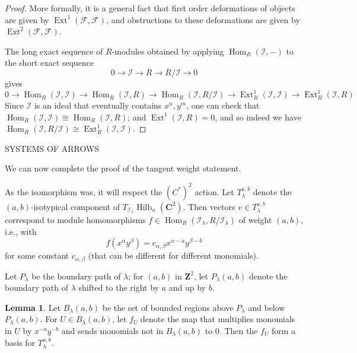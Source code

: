 \documentclass{amsart}[12pt]
\theoremstyle{definition}
\newtheorem{lemma}[dummy]{Lemma}
\newcommand{\Z}{\mathbf{Z}}
\newcommand{\C}{\mathbf{C}}
\newcommand{\II}{\mathcal{I}}
\DeclareMathOperator{\Hilb}{Hilb}
\DeclareMathOperator{\Ext}{Ext}
\DeclareMathOperator{\Hom}{Hom}
\begin{document}
\begin{proof}
More formally, it is a general fact that first order deformations of objects are given by $\Ext^1(\mathcal{F},\mathcal{F})$, and obstructions to these deformations are given by $\Ext^2(\mathcal{F},\mathcal{F})$. 

The long exact sequence of $R$-modules obtained by applying $\Hom_R(\II, -)$ to the short exact sequence
$$0\to \II\to R\to R/\II\to 0$$
gives 
$$0\to\Hom_R(\II,\II)\to \Hom_R(\II, R)\to\Hom_R(\II,R/\II)\to\Ext_R^1(\II, \II)\to\Ext_R^1(\II,R)$$
Since $\II$ is an ideal that eventually contains $x^n, y^m$, one can check that  $\Hom_R(\II,\II)\cong\Hom_R(\II, R)$;  and $\Ext^1(\II,R)=0$, and so indeed we have $\Hom_R(\II,R/\II)\cong\Ext_R^1(\II, \II)$.
\end{proof}


SYSTEMS OF ARROWS

We can now complete the proof of the tangent weight statement.

As the isomorphism was, it will respect the $(C^*)^2$ action.  Let $T_\lambda^{a,b}$ denote the $(a,b)$-isotypical component of $T_{\II_\lambda}\Hilb_n(\C^2)$.  Then vectors $v\in T_\lambda^{a,b}$ correspond to module homomorphisms $f\in\Hom_R(\II_\lambda, R/\II_\lambda)$ of weight $(a,b)$, i.e., with
$$f(x^{\alpha}y^\beta)=c_{\alpha,\beta} x^{\alpha-a}y^{\beta-b}$$
for some constant $c_{\alpha, \beta}$ (that can be different for different monomials).  


Let $P_\lambda$ be the boundary path of $\lambda$; for $(a,b)$ in $\Z^2$, let $P_\lambda(a,b)$ denote the boundary path of $\lambda$ shifted to the right by $a$ and up by $b$.

\begin{lemma} Let $B_\lambda(a,b)$ be the set of bounded regions above $P_\lambda$ and below $P_\lambda(a,b)$.  For $U\in B_\lambda(a,b)$, let $f_U$ denote the map that multiplies monomials in $U$ by $x^{-a}y^{-b}$ and sends monomials not in $B_\lambda(a,b)$ to $0$.  Then the $f_U$ form a basis for $T_\lambda^{a,b}$.
\end{lemma}
\end{document}
